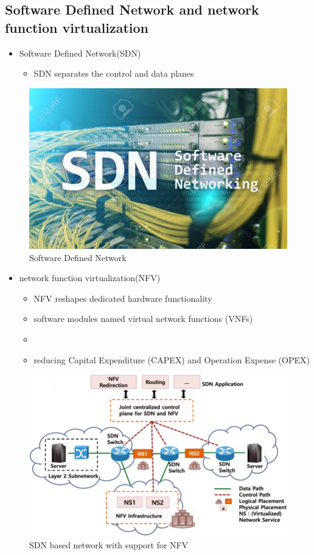 \documentclass{beamer}
\begin{document}
\subsection[SDN and NFV]{Software Defined Network and network function virtualization}
\begin{frame}
	\begin{itemize}
		\item Software Defined Network(SDN)
		\begin{itemize}
			\item {SDN separates the control and data planes}
		\end{itemize}
	\end{itemize}
\begin{figure}
	\centering
	\includegraphics[width=0.7\linewidth]{sdn2}
	\caption{Software Defined Network}
	\label{fig:sdn2}
\end{figure}

\end{frame}	
\begin{frame}
\begin{itemize}
	\item network function virtualization(NFV)
	\begin{itemize}
		\item {NFV reshapes dedicated hardware functionality}
		\item {software modules named virtual network functions (VNFs)}
		\item \color{blue}{agile and scalable service placement}
		\item \color{blue} {reducing Capital
			Expenditure (CAPEX) and Operation Expense (OPEX)}
	\end{itemize}
\end{itemize}
\begin{figure}
	\centering
	\includegraphics[width=0.62\linewidth]{Architecture-of-a-software-based-network-with-support-for-network-virtualization-NFV}
	\caption{SDN based network with support for NFV}
	\label{fig:architecture-of-a-software-based-network-with-support-for-network-virtualization-nfv}
\end{figure}
\end{frame}
\end{document}
